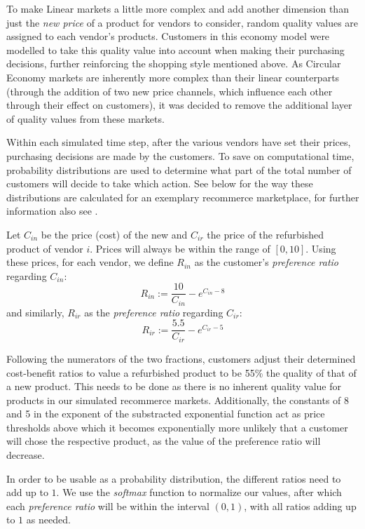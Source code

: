 To make Linear markets a little more complex and add another dimension than just the \emph{new price} of a product for vendors to consider, random quality values are assigned to each vendor's products. Customers in this economy model were modelled to take this quality value into account when making their purchasing decisions, further reinforcing the shopping style mentioned above. As Circular Economy markets are inherently more complex than their linear counterparts (through the addition of two new price channels, which influence each other through their effect on customers), it was decided to remove the additional layer of quality values from these markets.

Within each simulated time step, after the various vendors have set their prices, purchasing decisions are made by the customers. To save on computational time, probability distributions are used to determine what part of the total number of customers will decide to take which action. See below for the way these distributions are calculated for an exemplary recommerce marketplace, for further information also see \cite{NickThesis}.

\clearpage
\begin{definition}\label{def:customerDecisions}
	Let \(C_{in}\) be the price (cost) of the new and \(C_{ir}\) the price of the refurbished product of vendor \(i\). Prices will always be within the range of \([0,10]\). Using these prices, for each vendor, we define \(R_{in}\) as the customer's \emph{preference ratio} regarding \(C_{in}\):
	\[
		R_{in} := \frac{10}{C_{in}} - e^{C_{in} - 8}
	\]
	and similarly, \(R_{ir}\) as the \emph{preference ratio} regarding \(C_{ir}\):
	\[
		R_{ir} := \frac{5.5}{C_{ir}} - e^{C_{ir} - 5}
	\]
\end{definition}

Following the numerators of the two fractions, customers adjust their determined cost-benefit ratios to value a refurbished product to be 55\% the quality of that of a new product. This needs to be done as there is no inherent quality value for products in our simulated recommerce markets. Additionally, the constants of 8 and 5 in the exponent of the substracted exponential function act as price thresholds above which it becomes exponentially more unlikely that a customer will chose the respective product, as the value of the preference ratio will decrease.

In order to be usable as a probability distribution, the different ratios need to add up to \(1\). We use the \emph{softmax} function to normalize our values, after which each \emph{preference ratio} will be within the interval \((0,1)\), with all ratios adding up to \(1\) as needed.

